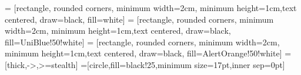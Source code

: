 

\usetikzlibrary{shapes.geometric, arrows}
 = [rectangle, rounded corners, minimum width=2cm, minimum height=1cm,text centered, draw=black, fill=white]
 = [rectangle, rounded corners, minimum width=2cm, minimum height=1cm,text centered, draw=black, fill=UniBlue!50!white]
 = [rectangle, rounded corners, minimum width=2cm, minimum height=1cm,text centered, draw=black, fill=AlertOrange!50!white]
 = [thick,->,>=stealth]
=[circle,fill=black!25,minimum size=17pt,inner sep=0pt]


\usepackage[symbol]{footmisc}
\renewcommand{\thefootnote}{\fnsymbol{footnote}}
